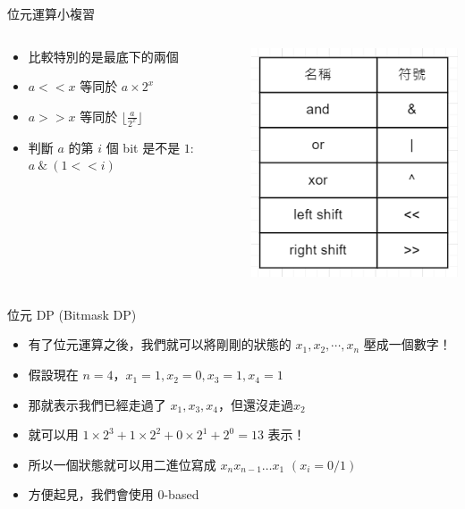 \documentclass[aspectratio=169]{beamer}
\begin{document}
    \begin{frame}{位元運算小複習}
        \begin{columns}
            \begin{column}{0.7 \textwidth}
                \begin{itemize}
                    \item 比較特別的是最底下的兩個
                    \item $a << x$ 等同於 $a \times 2^x$
                    \item $a >> x$ 等同於 $\lfloor \frac{a}{2^x} \rfloor$
                    \item 判斷 $a$ 的第 $i$ 個 bit 是不是 $1$: $a \ \& \ (1 << i)$
                \end{itemize}
            \end{column}
            \begin{column}{0.3 \textwidth}
                \begin{center}
                    \includegraphics[scale=0.55]{images/bit_operation.png}
                \end{center}
            \end{column}
        \end{columns}
    \end{frame}
    
    \begin{frame}{位元 DP (Bitmask DP)}
        \begin{itemize}
            \item 有了位元運算之後，我們就可以將剛剛的狀態的 $x_1,x_2,\cdots,x_n$ 壓成一個數字！
            \item 假設現在 $n=4$，$x_1 = 1, x_2 = 0, x_3 = 1, x_4 = 1$
            \item 那就表示我們已經走過了 $x_1, x_3, x_4$，但還沒走過$x_2$
            \item 就可以用 $1 \times 2^3 + 1 \times 2^2 + 0 \times 2^1 + 2^0 = 13$ 表示！
            \item 所以一個狀態就可以用二進位寫成 $x_n x_{n-1} \ldots x_1$ $(x_i = 0/1)$ 
            \item 方便起見，我們會使用 0-based
        \end{itemize}
    \end{frame}
    
\end{document}
